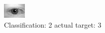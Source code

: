 \begin{figure}[h!]
\begin{center}
\includegraphics[width=0.60\columnwidth]{figures/ID573_class_2_target_3.png}
\end{center}
\caption{ Classification: 2 actual target: 3}
\label{fig:ID573_class_2_target_3}
\end{figure}
